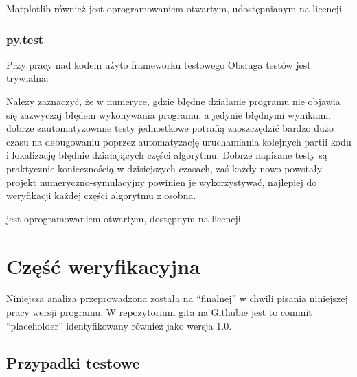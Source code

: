     Matplotlib również jest oprogramowaniem otwartym, udostępnianym na licencji

    \subsubsection{py.test}
    Przy pracy nad kodem użyto frameworku testowego  %
    Obsługa testów jest trywialna:


    Należy zaznaczyć, że w numeryce, gdzie błędne działanie programu nie objawia się
    zazwyczaj błędem wykonywania programu, a jedynie błędnymi wynikami, dobrze zautomatyzowane
    testy jednostkowe potrafią zaoszczędzić bardzo dużo czasu na debugowaniu
    poprzez automatyzację uruchamiania kolejnych partii kodu i lokalizację błędnie działających
    części algorytmu. Dobrze napisane testy są praktycznie koniecznością w dzisiejszych
    czasach, zaś każdy nowo powstały projekt numeryczno-symulacyjny powinien je
    wykorzystywać, najlepiej do weryfikacji każdej części algorytmu z osobna.

     jest oprogramowaniem otwartym, dostępnym na licencji %




    \section[Weryfikacja]{Część weryfikacyjna} %
    Niniejsza analiza przeprowadzona została na ``finalnej'' w chwili pisania niniejszej pracy wersji programu.
    W repozytorium gita na Githubie jest to commit ``placeholder'' %
    identyfikowany również jako wersja 1.0.

    \subsection{Przypadki testowe}


